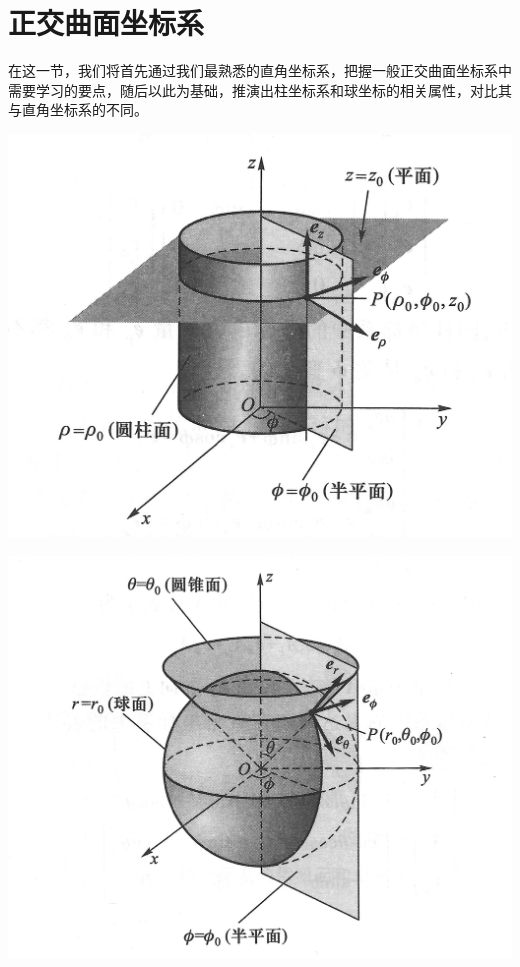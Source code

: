 \section{正交曲面坐标系}
在这一节，我们将首先通过我们最熟悉的直角坐标系，把握一般正交曲面坐标系中需要学习的要点，随后以此为基础，推演出柱坐标系和球坐标的相关属性，对比其与直角坐标系的不同。

\begin{Figure}[正交曲面坐标系]
    \begin{FigureSub}[柱坐标系]
        \includegraphics{image/ImageCompress/1.jpg}
    \end{FigureSub}
    \begin{FigureSub}[球坐标系]
        \includegraphics{image/ImageCompress/2.jpg}
    \end{FigureSub}
\end{Figure}

